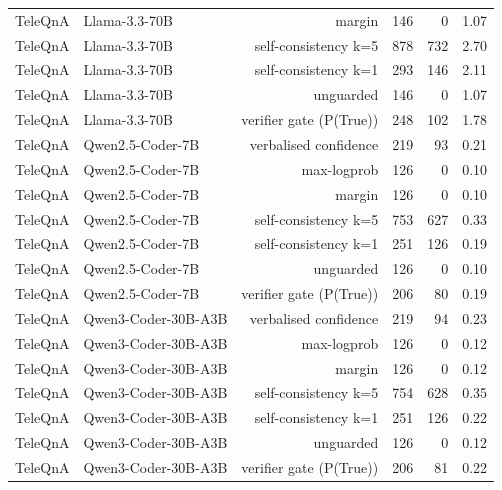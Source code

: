 \begin{tabular}{llrrrr}
TeleQnA & Llama-3.3-70B & margin & 146 & 0 & 1.07 \\
TeleQnA & Llama-3.3-70B & self-consistency k=5 & 878 & 732 & 2.70 \\
TeleQnA & Llama-3.3-70B & self-consistency k=1 & 293 & 146 & 2.11 \\
TeleQnA & Llama-3.3-70B & unguarded & 146 & 0 & 1.07 \\
TeleQnA & Llama-3.3-70B & verifier gate (P(True)) & 248 & 102 & 1.78 \\
TeleQnA & Qwen2.5-Coder-7B & verbalised confidence & 219 & 93 & 0.21 \\
TeleQnA & Qwen2.5-Coder-7B & max-logprob & 126 & 0 & 0.10 \\
TeleQnA & Qwen2.5-Coder-7B & margin & 126 & 0 & 0.10 \\
TeleQnA & Qwen2.5-Coder-7B & self-consistency k=5 & 753 & 627 & 0.33 \\
TeleQnA & Qwen2.5-Coder-7B & self-consistency k=1 & 251 & 126 & 0.19 \\
TeleQnA & Qwen2.5-Coder-7B & unguarded & 126 & 0 & 0.10 \\
TeleQnA & Qwen2.5-Coder-7B & verifier gate (P(True)) & 206 & 80 & 0.19 \\
TeleQnA & Qwen3-Coder-30B-A3B & verbalised confidence & 219 & 94 & 0.23 \\
TeleQnA & Qwen3-Coder-30B-A3B & max-logprob & 126 & 0 & 0.12 \\
TeleQnA & Qwen3-Coder-30B-A3B & margin & 126 & 0 & 0.12 \\
TeleQnA & Qwen3-Coder-30B-A3B & self-consistency k=5 & 754 & 628 & 0.35 \\
TeleQnA & Qwen3-Coder-30B-A3B & self-consistency k=1 & 251 & 126 & 0.22 \\
TeleQnA & Qwen3-Coder-30B-A3B & unguarded & 126 & 0 & 0.12 \\
TeleQnA & Qwen3-Coder-30B-A3B & verifier gate (P(True)) & 206 & 81 & 0.22 \\
\bottomrule
\end{tabular}
